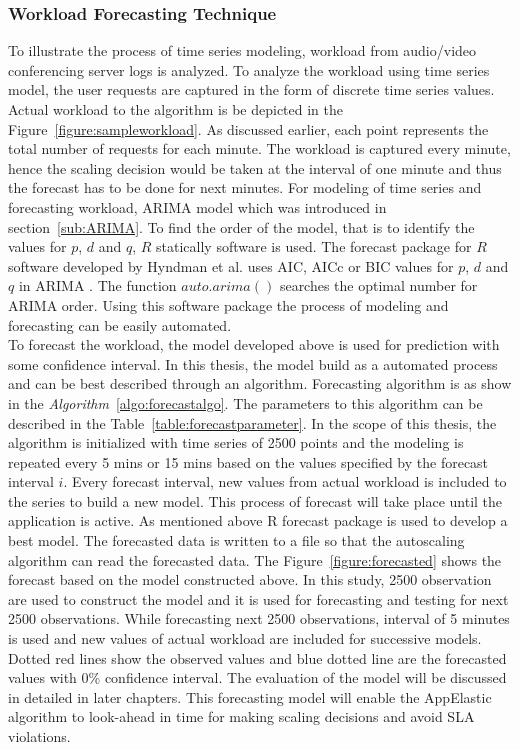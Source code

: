 \subsubsection{Workload Forecasting Technique}
\label{subs:Workload Forecasting Technique}
To illustrate the process of time series modeling, workload from audio/video conferencing server logs is analyzed. To analyze the workload using time series model, the user requests are captured in the form of discrete time series values. Actual workload to the algorithm is be depicted in the Figure~\ref{figure:sampleworkload}. As discussed earlier, each point represents the total number of requests for each minute. The workload is captured every minute, hence the scaling decision would be taken at the interval of one minute and thus the forecast has to be done for next minutes. For  modeling of time series and forecasting workload, ARIMA model which was introduced in section~\ref{sub:ARIMA}.
To find the order of the model, that is to identify the values for $p$, $d$ and $q$, \(R\) statically software is used. The forecast package for \(R\) software developed by Hyndman et al.\cite{hyndman2007automatic} uses AIC, AICc or BIC values\cite{hyndman2007automatic} for $p$, $d$ and $q$ in ARIMA . The function \(auto.arima()\) searches the optimal number for ARIMA order. Using this software package the process of modeling and forecasting can be easily automated.
\\
To forecast the workload, the model developed above is used for prediction with some confidence interval. In this thesis, the model build as a automated process and can be best described through an algorithm. Forecasting algorithm is as show in the \textit{Algorithm}~\ref{algo:forecastalgo}. The parameters to this algorithm can be described in the Table~\ref{table:forecastparameter}. In the scope of this thesis, the algorithm is initialized with time series of 2500 points and the modeling is repeated every 5 mins or 15 mins based on the values specified by the forecast interval \(i\). Every forecast interval, new values from actual workload is included to the series to build a new model. This process of forecast will take place until the application is active. As mentioned above R forecast package is used to develop a best model. The forecasted data is written to a file so that the autoscaling algorithm can read the forecasted data. The Figure~\ref{figure:forecasted}  shows the forecast based on the model constructed above. In this study, 2500 observation are used to construct the model and it is used for forecasting and testing for next 2500 observations. While forecasting next 2500 observations,  interval of 5 minutes is used and new values of actual workload are included for successive models. Dotted red lines show the observed values and blue dotted line are the forecasted values with 0\% confidence interval. The evaluation of the model will be discussed in detailed in later chapters. This forecasting model will enable the AppElastic algorithm to look-ahead in time for making scaling decisions and avoid SLA violations.

